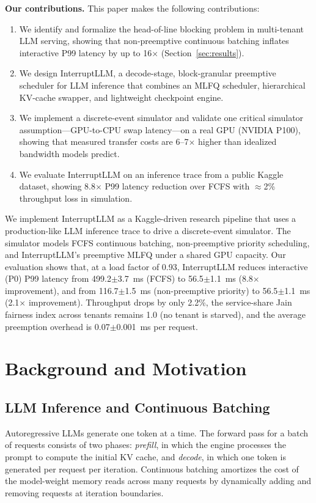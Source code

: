 \documentclass[conference]{IEEEtran}
\begin{document}
\textbf{Our contributions.} This paper makes the following contributions:
\begin{enumerate}
    \item We identify and formalize the head-of-line blocking problem in multi-tenant LLM serving, showing that non-preemptive continuous batching inflates interactive P99 latency by up to 16$\times$ (Section~\ref{sec:results}).
    \item We design InterruptLLM, a decode-stage, block-granular preemptive scheduler for LLM inference that combines an MLFQ scheduler, hierarchical KV-cache swapper, and lightweight checkpoint engine.
    \item We implement a discrete-event simulator and validate one critical simulator assumption---GPU-to-CPU swap latency---on a real GPU (NVIDIA P100), showing that measured transfer costs are 6--7$\times$ higher than idealized bandwidth models predict.
    \item We evaluate InterruptLLM on an inference trace from a public Kaggle dataset, showing 8.8$\times$ P99 latency reduction over FCFS with $\approx$2\% throughput loss in simulation.
\end{enumerate}

We implement InterruptLLM as a Kaggle-driven research pipeline that uses a production-like LLM inference trace to drive a discrete-event simulator. The simulator models FCFS continuous batching, non-preemptive priority scheduling, and InterruptLLM's preemptive MLFQ under a shared GPU capacity. Our evaluation shows that, at a load factor of 0.93, InterruptLLM reduces interactive (P0) P99 latency from 499.2$\pm$3.7~ms (FCFS) to 56.5$\pm$1.1~ms (8.8$\times$ improvement), and from 116.7$\pm$1.5~ms (non-preemptive priority) to 56.5$\pm$1.1~ms (2.1$\times$ improvement). Throughput drops by only 2.2\%, the service-share Jain fairness index across tenants remains 1.0 (no tenant is starved), and the average preemption overhead is 0.07$\pm$0.001~ms per request.

\section{Background and Motivation}\label{sec:background}

\subsection{LLM Inference and Continuous Batching}

Autoregressive LLMs generate one token at a time. The forward pass for a batch of requests consists of two phases: \emph{prefill}, in which the engine processes the prompt to compute the initial KV cache, and \emph{decode}, in which one token is generated per request per iteration. Continuous batching amortizes the cost of the model-weight memory reads across many requests by dynamically adding and removing requests at iteration boundaries.
\end{document}

